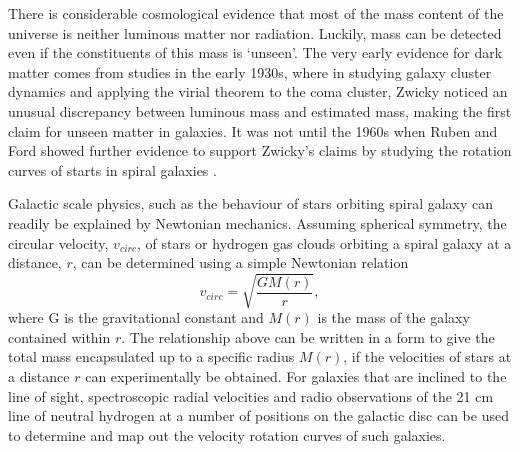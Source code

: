 There is considerable cosmological evidence that most of the mass content of the universe is neither luminous matter nor radiation. Luckily, mass can be detected even if the constituents of this mass is `unseen'. The very early evidence for dark matter comes from studies in the early 1930s, where in studying galaxy cluster dynamics and applying the virial theorem to the coma cluster, Zwicky \cite{Fritz_Zwicky_1993} noticed an unusual discrepancy between luminous mass and
estimated mass, making the first claim for unseen matter in galaxies. It was not until the 1960s when Ruben and Ford showed further evidence to support Zwicky's claims by studying the rotation curves of starts in spiral galaxies \cite{ruben_ford, ruben_ford_results}.

Galactic scale physics, such as the behaviour of stars orbiting spiral galaxy can readily be explained by Newtonian mechanics. Assuming spherical symmetry, the circular velocity, $v_{circ}$, of stars or hydrogen gas clouds orbiting a spiral galaxy at a distance, $r$, can be determined using a simple Newtonian relation
%
\begin{equation}
    v_{circ} = \sqrt{\frac{GM(r)}{r}},
\end{equation}
%
where G is the gravitational constant and $M(r)$ is the mass of the galaxy contained within $r$. The relationship above can be written in a form to give the total mass encapsulated up to a specific radius $M(r)$, if the velocities of stars at a distance $r$ can experimentally be obtained. For galaxies that are inclined to the line of sight, spectroscopic radial velocities and radio observations of the 21 cm line of neutral hydrogen at a number of positions on the galactic disc can be used to determine and map out the velocity rotation curves of such galaxies.

